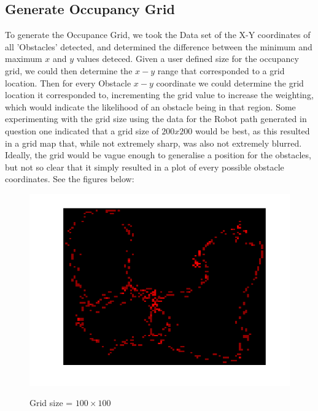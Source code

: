 {	\subsection{Generate Occupancy Grid}
	To generate the Occupance Grid, we took the Data set of the X-Y coordinates of all 'Obstacles' detected, and determined the difference between the minimum and maximum ${x}$ and ${y}$ values deteced. Given a user defined size for the occupancy grid, we could then determine the ${x-y}$ range that corresponded to a grid location. Then for every Obstacle ${x-y}$ coordinate we could determine the grid location it corresponded to, incrementing the grid value to increase the weighting, which would indicate the likelihood of an obstacle being in that region. Some experimenting with the grid size using the data for the Robot path generated in question one indicated that a grid size of ${200x200}$ would be best, as this resulted in a grid map that, while not extremely sharp, was also not extremely blurred. Ideally, the grid would be vague enough to generalise a position for the obstacles, but not so clear that it simply resulted in a plot of every possible obstacle coordinates. See the figures below:\newline 
	
		\begin{figure}[position = here]
			\begin{centering}
				\includegraphics[scale=1]{./images/q2/heatmap_path_100.png}\\
				\caption{Grid size = ${100 \times 100}$}
			\end{centering}
		\end{figure}
		\newline
		
}
